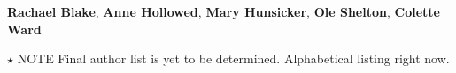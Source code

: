 \textbf{Rachael Blake}, 
\textbf{Anne Hollowed}, 
\textbf{Mary Hunsicker}, 
\textbf{Ole Shelton}, 
\textbf{Colette Ward} 


$\star$ NOTE Final author list is yet to be determined. Alphabetical listing right now. 
